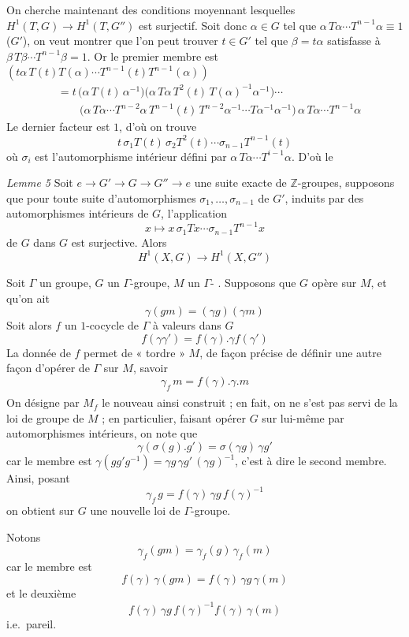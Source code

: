 \documentclass[11pt,a4paper]{article}
\begin{document}
On cherche maintenant des conditions moyennant lesquelles
$H^1(T, G) \to H^1(T, G'')$ est surjectif. Soit donc $\alpha \in G$ tel que
$\alpha\,T\alpha \cdots T^{n-1}\alpha \equiv 1$ ($G'$), on veut montrer que
l'on peut trouver $t \in G'$ tel que $\beta = t\alpha$ satisfasse à
$\beta\,T\beta \cdots T^{n-1}\beta = 1$. Or le premier membre est
$(t\alpha\,T(t)T(\alpha) \cdots T^{n-1}(t)T^{n-1}(\alpha))$
\begin{align*}
  &= t\,\bigl(\alpha\,T(t)\,\alpha^{-1}\bigr)
  \bigl(\alpha\,T\alpha\,T^{2}(t)\,T(\alpha)^{-1}\alpha^{-1}\bigr) \cdots \\
  &\qquad \bigl(\alpha\,T\alpha \cdots T^{n-2}\alpha\,T^{n-1}(t)\,T^{n-2}\alpha^{-1}
  \cdots T\alpha^{-1}\alpha^{-1}\bigr)\,\alpha\,T\alpha \cdots T^{n-1}\alpha
\end{align*}
Le dernier facteur est $1$, d'où on trouve
\[
  t\,\sigma_1 T(t)\,\sigma_2 T^{2}(t) \cdots \sigma_{n-1}T^{n-1}(t)
\]
où $\sigma_i$ est l'automorphisme intérieur défini par
$\alpha\,T\alpha \cdots T^{i-1}\alpha$. D'où le \struck{\ill{}}

\emph{Lemme 5} \quad Soit $e \to G' \to G \to G'' \to e$ une suite exacte de
$\mathbb{Z}$-groupes, supposons que pour toute suite d'automorphismes
$\sigma_1, \ldots, \sigma_{n-1}$ de $G'$, induits par des automorphismes
intérieurs de $G$, l'application
\[
  x \longmapsto x\,\sigma_1 Tx \cdots \sigma_{n-1}T^{n-1}x
\]
de $G$ dans $G$ est surjective. Alors
\[
  H^1(X, G) \to H^1(X, G'')
\]


Soit $\Gamma$ un groupe, $G$ un $\Gamma$-groupe, $M$ un $\Gamma$- . Supposons que $G$ opère sur $M$, et qu'on ait
\[
  \gamma(gm) = (\gamma g)(\gamma m)
\]
Soit alors $f$ un $1$-cocycle de $\Gamma$ à valeurs dans $G$
\[
  f(\gamma\gamma') = f(\gamma).\gamma f(\gamma')
\]
La donnée de $f$ permet de « tordre » $M$, de façon précise de définir une
autre façon d'opérer de $\Gamma$ sur $M$, savoir
\[
  \gamma_f\, m = f(\gamma).\gamma.m
\]
\begin{align*}
  [\text{car} \quad \gamma_f(\gamma'_f m) &= f(\gamma)\gamma\bigl(f(\gamma')
    \gamma' m\bigr) = f(\gamma)\,\gamma f(\gamma')\,\gamma\gamma' m \\
  &= f(\gamma\gamma')\,\gamma\gamma' m = (\gamma\gamma')_f\, m \\
  e_f\, m &= f(e).e.m = m \ ]
\end{align*}
On désigne par $M_f$ le nouveau \struck{\ill{}}  ainsi
construit ; en fait, on ne s'est pas servi de la loi de groupe de
$M$ ; en particulier, faisant opérer $G$ sur lui-même par automorphismes
intérieurs, on  note que
\[
  \gamma(\sigma(g).g') = \sigma(\gamma g)\,\gamma g'
\]
car le \struck{\ill{}}  membre est $\gamma(gg'g^{-1}) = \gamma g\,
\gamma g'\,(\gamma g)^{-1}$, c'est à dire le second membre. Ainsi, posant
\[
  \gamma_f\, g = f(\gamma)\,\gamma g\, f(\gamma)^{-1}
\]
on obtient sur $G$ une nouvelle loi de $\Gamma$-groupe.

Notons 
\[
  \gamma_f(gm) = \gamma_f(g)\,\gamma_f(m)
\]
car le   membre est
\[
  f(\gamma)\,\gamma(gm) = f(\gamma)\,\gamma g\,\gamma(m)
\]
et le deuxième
\[
  f(\gamma)\,\gamma g\, f(\gamma)^{-1} f(\gamma)\,\gamma(m)
\]
i.e.\ pareil.
\end{document}
